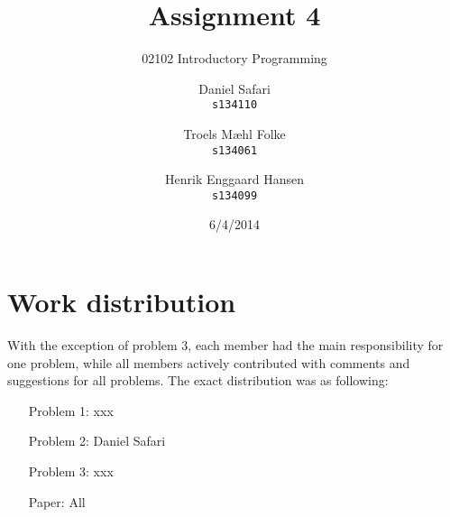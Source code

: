\documentclass{scrartcl}
\begin{document}

\title{Assignment 4}
\subtitle{02102 Introductory Programming}
\author{
  Daniel Safari\\
  \texttt{s134110}
  \and
  Troels Mæhl Folke\\
  \texttt{s134061}
   \and
  Henrik Enggaard Hansen\\
  \texttt{s134099}
}
\date{6/4/2014}
\maketitle
\thispagestyle{empty}
\setcounter{page}{0}
\null
\vfill
\section*{Work distribution}

With the exception of problem 3, each member had the main responsibility for one problem, while all members
actively contributed with comments and suggestions for all problems. The
exact distribution was as following:
\begin{itemize}
\setlength{\itemindent}{3em}
\item[Problem 1:] xxx
\item[Problem 2:] Daniel Safari
\item[Problem 3:] xxx
\item[Paper:]  All
\end{itemize}
\newpage






\end{document}
